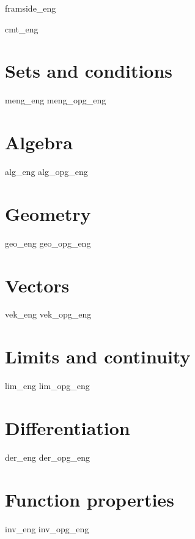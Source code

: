 



\usepackage[angle=0, scale=0.05, color={[rgb]{1,0,0}}, vpos = 20pt]{draftwatermark}



	
	{framside_eng}
	
	{\footnotesize \tableofcontents}
	\newpage
	
	{cmt_eng}
	
	\chapter{Sets and conditions} \label{Meng}
	\newpage
	{meng_eng}
	{meng_opg_eng}
	
	\chapter{Algebra} \label{Alg}
	\newpage
	{alg_eng} 
	{alg_opg_eng}
	
	\chapter{Geometry} \label{Geo}
	\newpage
	{geo_eng}
	{geo_opg_eng}	
	
	\chapter{Vectors} \label{Vek}
	\newpage
	{vek_eng}
	{vek_opg_eng}	
		
	\chapter{Limits and continuity} \label{Lim}
	\newpage
	{lim_eng}	
	{lim_opg_eng}

	\chapter{Differentiation} \label{Derivasjon} \label{Der}
	\newpage
	{der_eng}
	{der_opg_eng}	
	
	\chapter{Function properties} \label{Funk}
	\newpage
	{inv_eng}
	{inv_opg_eng}

